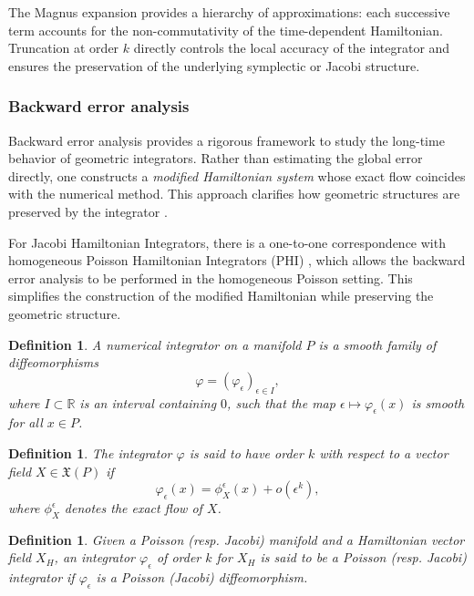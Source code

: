\documentclass[12pt,english]{article}
\newtheorem{definition}[thm]{Definition}
\begin{document}
The Magnus expansion provides a hierarchy of approximations: each successive term accounts for the non-commutativity of the time-dependent Hamiltonian. Truncation at order $k$ directly controls the local accuracy of the integrator and ensures the preservation of the underlying symplectic or Jacobi structure.


\subsubsection{Backward error analysis}

Backward error analysis provides a rigorous framework to study the long-time behavior of geometric integrators. Rather than estimating the global error directly, one constructs a \emph{modified Hamiltonian system} whose exact flow coincides with the numerical method. This approach clarifies how geometric structures are preserved by the integrator \cite{Hairer2006N}.

For Jacobi Hamiltonian Integrators, there is a one-to-one correspondence with homogeneous Poisson Hamiltonian Integrators (PHI) \cite{araujo2025jacobihamiltonianintegrators}, which allows the backward error analysis to be performed in the homogeneous Poisson setting. This simplifies the construction of the modified Hamiltonian while preserving the geometric structure.

\begin{definition}
A \emph{numerical integrator} on a manifold $P$ is a smooth family of diffeomorphisms 
\[
\varphi = (\varphi_\epsilon)_{\epsilon \in I}, 
\]
where $I \subset \mathbb{R}$ is an interval containing $0$, such that the map $\epsilon \mapsto \varphi_\epsilon(x)$ is smooth for all $x \in P$.
\end{definition}

\begin{definition}
The integrator $\varphi$ is said to have \emph{order $k$} with respect to a vector field $X \in \mathfrak{X}(P)$ if
\[
\varphi_\epsilon(x) = \phi_X^\epsilon(x) + o(\epsilon^k),
\]
where $\phi_X^\epsilon$ denotes the exact flow of $X$.
\end{definition}

\begin{definition}
    Given a Poisson (resp. Jacobi) manifold and a Hamiltonian vector field $X_H$, an integrator $\varphi_\epsilon$ of order $k$ for $X_H$ is said to be a Poisson (resp. Jacobi) integrator if $\varphi_\epsilon$ is a Poisson (Jacobi) diffeomorphism.
\end{definition}
\end{document}
